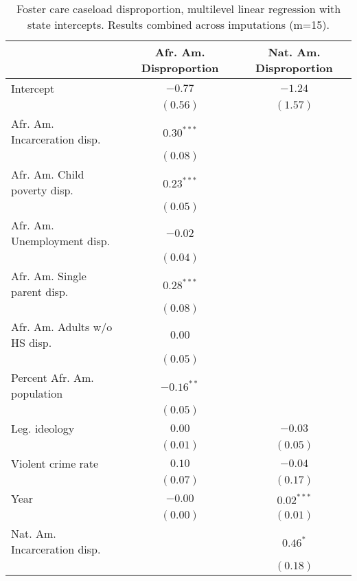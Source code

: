 
\begin{table}
\caption{Foster care caseload disproportion, multilevel linear
regression with state intercepts. Results combined across imputations (m=15).}
\begin{center}
\begin{tabular}{l c c }
\hline
 & Afr. Am. Disproportion & Nat. Am. Disproportion \\
\hline
Intercept                    & $-0.77$      & $-1.24$      \\
                             & $(0.56)$     & $(1.57)$     \\
Afr. Am. Incarceration disp. & $0.30^{***}$ &              \\
                             & $(0.08)$     &              \\
Afr. Am. Child poverty disp. & $0.23^{***}$ &              \\
                             & $(0.05)$     &              \\
Afr. Am. Unemployment disp.  & $-0.02$      &              \\
                             & $(0.04)$     &              \\
Afr. Am. Single parent disp. & $0.28^{***}$ &              \\
                             & $(0.08)$     &              \\
Afr. Am. Adults w/o HS disp. & $0.00$       &              \\
                             & $(0.05)$     &              \\
Percent Afr. Am. population  & $-0.16^{**}$ &              \\
                             & $(0.05)$     &              \\
Leg. ideology                & $0.00$       & $-0.03$      \\
                             & $(0.01)$     & $(0.05)$     \\
Violent crime rate           & $0.10$       & $-0.04$      \\
                             & $(0.07)$     & $(0.17)$     \\
Year                         & $-0.00$      & $0.02^{***}$ \\
                             & $(0.00)$     & $(0.01)$     \\
Nat. Am. Incarceration disp. &              & $0.46^{*}$   \\
                             &              & $(0.18)$     \\

\end{tabular}
\end{center}
\end{table}
